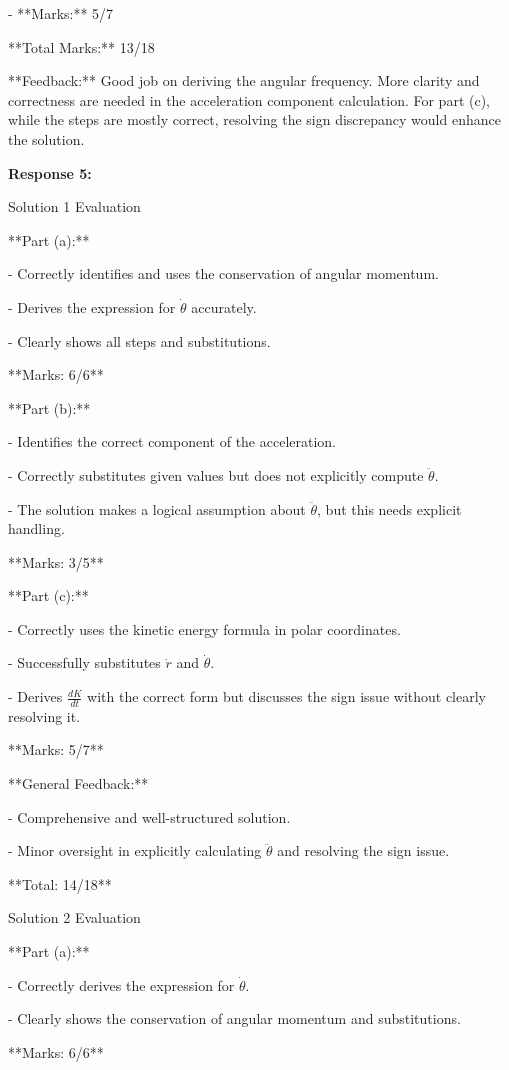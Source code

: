 \documentclass[a4paper,11pt]{article}
\begin{document}
- **Marks:** 5/7

**Total Marks:** 13/18

**Feedback:** Good job on deriving the angular frequency. More clarity and correctness are needed in the acceleration component calculation. For part (c), while the steps are mostly correct, resolving the sign discrepancy would enhance the solution.

\bigskip
\textbf{Response 5:}

Solution 1 Evaluation

**Part (a):**

- Correctly identifies and uses the conservation of angular momentum.

- Derives the expression for \(\dot{\theta}\) accurately.

- Clearly shows all steps and substitutions.

**Marks: 6/6**

**Part (b):**

- Identifies the correct component of the acceleration.

- Correctly substitutes given values but does not explicitly compute \(\ddot{\theta}\).

- The solution makes a logical assumption about \(\ddot{\theta}\), but this needs explicit handling.

**Marks: 3/5**

**Part (c):**

- Correctly uses the kinetic energy formula in polar coordinates.

- Successfully substitutes \(\dot{r}\) and \(\dot{\theta}\).

- Derives \(\frac{dK}{dt}\) with the correct form but discusses the sign issue without clearly resolving it.

**Marks: 5/7**

**General Feedback:**

- Comprehensive and well-structured solution.

- Minor oversight in explicitly calculating \(\ddot{\theta}\) and resolving the sign issue.

**Total: 14/18**

Solution 2 Evaluation

**Part (a):**

- Correctly derives the expression for \(\dot{\theta}\).

- Clearly shows the conservation of angular momentum and substitutions.

**Marks: 6/6**
\end{document}
